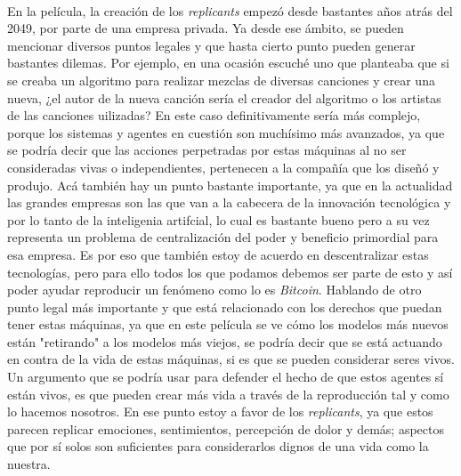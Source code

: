 \documentclass{scrreprt}
\begin{document}
\paragraph{}En la película, la creación de los \emph{replicants} empezó desde bastantes años atrás del 2049, por parte de una empresa privada. Ya desde ese ámbito, se pueden mencionar diversos puntos legales y que hasta cierto punto pueden generar bastantes dilemas. Por ejemplo, en una ocasión escuché uno que planteaba que si se creaba un algoritmo para realizar mezclas de diversas canciones y crear una nueva, ¿el autor de la nueva canción sería el creador del algoritmo o los artistas de las canciones uilizadas? En este caso definitivamente sería más complejo, porque los sistemas y agentes en cuestión son muchísimo más avanzados, ya que se podría decir que las acciones perpetradas por estas máquinas al no ser consideradas vivas o independientes, pertenecen a la compañía que los diseñó y produjo. Acá también hay un punto bastante importante, ya que en la actualidad las grandes empresas son las que van a la cabecera de la innovación tecnológica y por lo tanto de la inteligenia artifcial, lo cual es bastante bueno pero a su vez representa un problema de centralización del poder y beneficio primordial para esa empresa. Es por eso que también estoy de acuerdo en descentralizar estas tecnologías, pero para ello todos los que podamos debemos ser parte de esto y así poder ayudar reproducir un fenómeno como lo es \emph{Bitcoin}. Hablando de otro punto legal más importante y que está relacionado con los derechos que puedan tener estas máquinas, ya que en este película se ve cómo los modelos más nuevos están "retirando" a los modelos más viejos, se podría decir que se está actuando en contra de la vida de estas máquinas, si es que se pueden considerar seres vivos. Un argumento que se podría usar para defender el hecho de que estos agentes sí están vivos, es que pueden crear más vida a través de la reproducción tal y como lo hacemos nosotros. En ese punto estoy a favor de los \emph{replicants}, ya que estos parecen replicar emociones, sentimientos, percepción de dolor y demás; aspectos que por sí solos son suficientes para considerarlos dignos de una vida como la nuestra.
\end{document}
